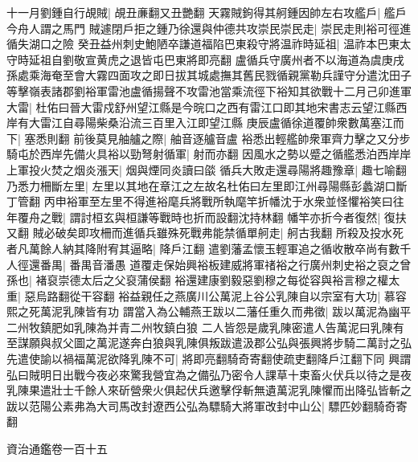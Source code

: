 十一月劉鍾自行覘賊|{
	覘丑亷翻又丑艷翻}
天霧賊鉤得其舸鍾因帥左右攻艦戶|{
	艦戶今舟人謂之馬門}
賊遽閉戶拒之鍾乃徐還與仲德共攻崇民崇民走|{
	崇民走則裕可徑進循失湖口之險}
癸丑益州刺史鮑陋卒謙道福陷巴東殺守將温祚時延祖|{
	温祚本巴東太守時延祖自劉敬宣黄虎之退皆屯巴東將即亮翻}
盧循兵守廣州者不以海道為虞庚戌孫處乘海奄至會大霧四面攻之即日拔其城處撫其舊民戮循親黨勒兵謹守分遣沈田子等擊嶺表諸郡劉裕軍雷池盧循揚聲不攻雷池當乘流徑下裕知其欲戰十二月己卯進軍大雷|{
	杜佑曰晉大雷戍舒州望江縣是今晥口之西有雷江口即其地宋書志云望江縣西岸有大雷江自尋陽柴桑沿流三百里入江即望江縣}
庚辰盧循徐道覆帥衆數萬塞江而下|{
	塞悉則翻}
前後莫見舳艫之際|{
	舳音逐艫音盧}
裕悉出輕艦帥衆軍齊力擊之又分步騎屯於西岸先備火具裕以勁弩射循軍|{
	射而亦翻}
因風水之勢以蹙之循艦悉泊西岸岸上軍投火焚之烟炎漲天|{
	烟與煙同炎讀曰燄}
循兵大敗走還尋陽將趣豫章|{
	趣七喻翻}
乃悉力柵斷左里|{
	左里以其地在章江之左故名杜佑曰左里即江州尋陽縣彭蠡湖口斷丁管翻}
丙申裕軍至左里不得進裕麾兵將戰所執麾竿折幡沈于水衆並怪懼裕笑曰往年覆舟之戰|{
	謂討桓玄與桓謙等戰時也折而設翻沈持林翻}
幡竿亦折今者復然|{
	復扶又翻}
賊必破矣即攻柵而進循兵雖殊死戰弗能禁循單舸走|{
	舸古我翻}
所殺及投水死者凡萬餘人納其降附宥其逼略|{
	降戶江翻}
遣劉藩孟懷玉輕軍追之循收散卒尚有數千人徑還番禺|{
	番禺音潘愚}
道覆走保始興裕板建威將軍禇裕之行廣州刺史裕之裒之曾孫也|{
	褚裒崇德太后之父裒蒲侯翻}
裕還建康劉毅惡劉穆之每從容與裕言穆之權太重|{
	惡烏路翻從干容翻}
裕益親任之燕廣川公萬泥上谷公乳陳自以宗室有大功|{
	慕容熙之死萬泥乳陳皆有功}
謂當入為公輔燕王跋以二藩任重久而弗徵|{
	跋以萬泥為幽平二州牧鎮肥如乳陳為并青二州牧鎮白狼}
二人皆怨是歲乳陳密遣人告萬泥曰乳陳有至謀願與叔父圖之萬泥遂奔白狼與乳陳俱叛跋遣汲郡公弘與張興將步騎二萬討之弘先遣使諭以禍福萬泥欲降乳陳不可|{
	將即亮翻騎奇寄翻使疏吏翻降戶江翻下同}
興謂弘曰賊明日出戰今夜必來驚我營宜為之備弘乃密令人課草十束畜火伏兵以待之是夜乳陳果遣壯士千餘人來斫營衆火俱起伏兵邀擊俘斬無遺萬泥乳陳懼而出降弘皆斬之跋以范陽公素弗為大司馬改封遼西公弘為驃騎大將軍改封中山公|{
	驃匹妙翻騎奇寄翻}


資治通鑑卷一百十五
